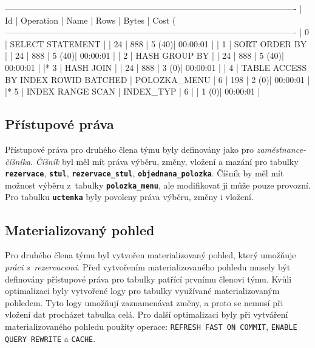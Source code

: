 \documentclass[11pt, a4paper]{article}
\begin{document}
\begin{verbnobox}[\scriptsize]
-------------------------------------------------------------------------------------------------------
| Id  | Operation                               | Name         | Rows  | Bytes | Cost (%
-------------------------------------------------------------------------------------------------------
|   0 | SELECT STATEMENT                        |              |    24 |   888 |     5  (40)| 00:00:01 |
|   1 |  SORT ORDER BY                          |              |    24 |   888 |     5  (40)| 00:00:01 |
|   2 |   HASH GROUP BY                         |              |    24 |   888 |     5  (40)| 00:00:01 |
|*  3 |    HASH JOIN                            |              |    24 |   888 |     3   (0)| 00:00:01 |
|   4 |     TABLE ACCESS BY INDEX ROWID BATCHED | POLOZKA_MENU |     6 |   198 |     2   (0)| 00:00:01 |
|*  5 |      INDEX RANGE SCAN                   | INDEX_TYP    |     6 |       |     1   (0)| 00:00:01 |
\end{verbnobox}

\subsection{Přístupové práva}

Přístupové práva pro druhého člena týmu byly definovány jako pro \emph{zaměstnance-číšníka}. \emph{Číšník} byl měl mít práva výběru, změny, vložení a mazání pro tabulky \textbf{\texttt{rezervace}}, \textbf{\texttt{stul}}, \textbf{\texttt{rezervace\_stul}}, \linebreak \textbf{\texttt{objednana\_polozka}}. Číšník by měl mít možnost výběru z~tabulky \textbf{\texttt{polozka\_menu}}, ale modifikovat ji může pouze provozní. Pro tabulku \textbf{\texttt{uctenka}} byly povoleny práva výběru, změny i vložení.

\subsection{Materializovaný pohled}

Pro druhého člena týmu byl vytvořen materializovaný pohled, který umožňuje \emph{práci s~rezervacemi}. Před vytvořením materializovaného pohledu musely být definovány přístupové práva pro tabulky patřící prvnímu členovi týmu. Kvůli optimalizaci byly vytvořené logy pro tabulky využívané materializovaným pohledem. Tyto logy umožňují zaznamenávat změny, a proto se nemusí při vložení dat procházet tabulka celá. Pro další optimalizaci byly při vytváření materializovaného pohledu použity operace: \texttt{REFRESH FAST ON COMMIT}, \texttt{ENABLE QUERY REWRITE} a \texttt{CACHE}.
\end{document}
